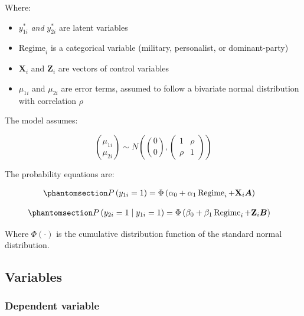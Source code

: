 \documentclass[
  12pt,
]{report}
\begin{document}
Where:

\begin{itemize}
\item
  \(y_{1i}^*\) \emph{and} \(y_{2i}^*\) are latent variables
\item
  \(\text{Regime}_i\) is a categorical variable (military, personalist,
  or dominant-party)
\item
  \(\mathbf{X}_i\) and \(\mathbf{Z}_i\) are vectors of control variables
\item
  \(\mu_{1i}\) and \(\mu_{2i}\) are error terms, assumed to follow a
  bivariate normal distribution with correlation \(\rho\)
\end{itemize}

The model assumes:

\[
\binom{\mu_{1 i}}{\mu_{2 i}} \sim N\left(\binom{0}{0},\left(\begin{array}{ll}
1 & \rho \\
\rho & 1
\end{array}\right)\right)
\]

The probability equations are:

\begin{equation}\phantomsection\label{eq-eq7}{
\begin{aligned}
P\left(y_{1 i}=1\right) & =\Phi\left(\alpha_0+\alpha_1 \operatorname{Regime}_i+\mathbf{X}_i \boldsymbol{A}\right)
\end{aligned}
}\end{equation}

\begin{equation}\phantomsection\label{eq-eq8}{
\begin{aligned}
P\left(y_{2 i}=1 \mid y_{1 i}=1\right) & =\Phi\left(\beta_0+\beta_1 \operatorname{Regime}_i+\mathbf{Z}_i \boldsymbol{B}\right)
\end{aligned}
}\end{equation}

Where \(\Phi(\cdot)\) is the cumulative distribution function of the
standard normal distribution.

\subsection{Variables}\label{variables}

\subsubsection{Dependent variable}\label{dependent-variable}
\end{document}
